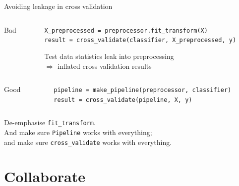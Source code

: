 \documentclass[aspectratio=169, 22pt]{beamer}
\newcommand{\hl}{\textcolor{usydred}}
\begin{document}
\begin{plain}{Avoiding leakage in cross validation}
	\begin{columns}[t]\begin{column}{0.1\textwidth}Bad\end{column}\begin{column}{.9\textwidth}
\verb|X_preprocessed = preprocessor.fit_transform(X)|\\
\verb|result = cross_validate(classifier, X_preprocessed, y)|

	\vspace{1em}
Test data statistics \hl{leak} into preprocessing\\
	$\Rightarrow$ inflated cross validation results
	\end{column}\end{columns}
	\vspace{1em}

	\begin{columns}[t]\begin{column}{0.1\textwidth}Good\end{column}\begin{column}{.9\textwidth}
\verb|pipeline = make_pipeline(preprocessor, classifier)|\\
\verb|result = cross_validate(pipeline, X, y)|
	\end{column}\end{columns}

	\vfill
	\pause
	\begin{itemize}
			\p[Solution] De-emphasise \verb|fit_transform|.\\
			And make sure \verb|Pipeline| works with everything;\\
			and make sure \verb|cross_validate| works with everything.
	\end{itemize}
\end{plain}


\section{Collaborate}
\end{document}
